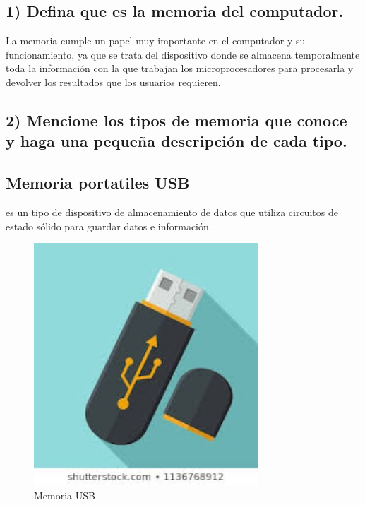 \documentclass{article}
\begin{document}
\subsection*{1) Defina que es la memoria del computador.}
La memoria cumple un papel muy importante en el computador y su funcionamiento, ya que se trata del dispositivo donde se almacena temporalmente toda la información con la que trabajan los microprocesadores para procesarla y devolver los resultados que los usuarios requieren.\\[0.5cm]
 \subsection*{2) Mencione los tipos de memoria que conoce y haga una pequeña descripción de cada tipo.}
\subsection*{Memoria portatiles USB}
es un tipo de dispositivo de almacenamiento de datos que utiliza circuitos de estado sólido para guardar datos e información.\\[8cm]
\begin{figure}[h!]
    \centering
    \includegraphics[width=0.75\textwidth]{usb.jpg}
    \caption{Memoria USB}
    \label{fig:my_label}
\end{figure}
\end{document}
